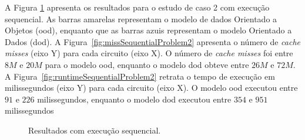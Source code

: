 A Figura \ref{fig:problem2resultSequencial} apresenta os resultados para o estudo de caso 2 com execução sequencial. As barras amarelas representam o modelo de dados Orientado a Objetos (\ac{ood}), enquanto que as barras azuis representam o modelo Orientado a Dados (\ac{dod}). A Figura~\ref{fig:missSequentialProblem2} apresenta o número de  \textit{cache misses} (eixo Y) para cada circuito (eixo X). O número de  \textit{cache misses} foi entre $8M$ e $20M$ para o modelo \ac{ood}, enquanto o modelo \ac{dod} obteve entre $26M$ e $72M$.
A Figura~\ref{fig:runtimeSequentialProblem2} retrata o tempo de execução em milissegundos (eixo Y) para cada circuito (eixo X).
O modelo \ac{ood} executou entre $91$ e $226$ milissegundos, enquanto o modelo \ac{dod} executou entre $354$ e $951$ milissegundos 

\begin{figure}[ht]
    \centering
    \caption[Resultados estudo de caso 2 com execução sequencial]{Resultados com execução sequencial.}
    \label{fig:problem2resultSequencial}
\end{figure}


